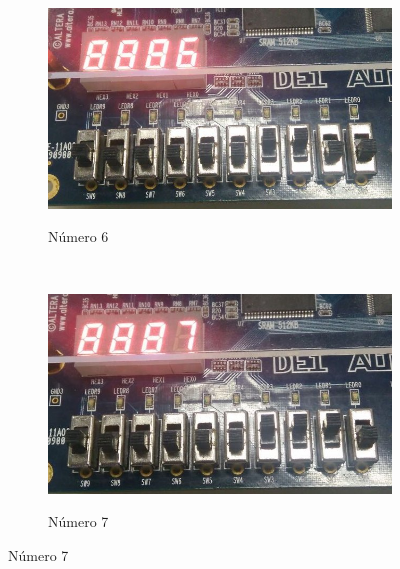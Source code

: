 		\begin{figure}[H]
			\centering

			\begin{subfigure}[b]{0.44\textwidth}
				\includegraphics[width=\textwidth]{img/etapa1/6}
				\label{fig:etapa1-6}
				\caption{Número 6}
			\end{subfigure}
			~
			\begin{subfigure}[b]{0.44\textwidth}
				\includegraphics[width=\textwidth]{img/etapa1/7}
				\label{fig:etapa1-7}
				\caption{Número 7}
			\end{subfigure}


\end{figure}
